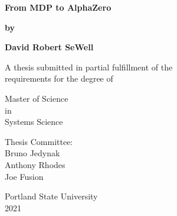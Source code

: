 

\begin{titlepage}
    \begin{center}
       
       \textbf{From MDP to AlphaZero}
    
       \vspace{2.5cm}
        
       \textbf{by}
       
       \textbf{David Robert SeWell}
        
        \vspace{2.0cm}
        
       A thesis submitted in partial fulfillment of the \\
       requirements for the degree of
       
       \vspace{1.0cm}
       Master of Science\\
       in\\
       Systems Science
       
       \vspace{2.0cm}
        Thesis Committee:\\
        Bruno Jedynak\\
        Anthony Rhodes\\
        Joe Fusion\\
        
       \vspace{2.5cm}
    
       Portland State University\\
       2021
            
    \end{center}
\end{titlepage}
